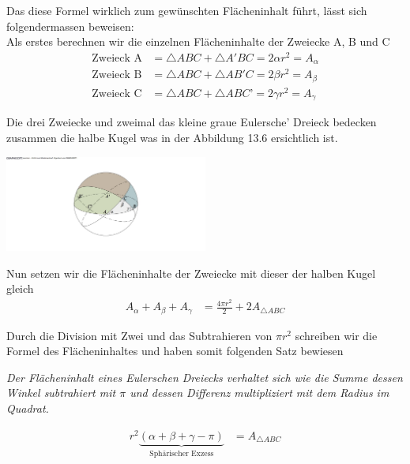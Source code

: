 \begin{refsection}
\begin{refsection}
Das diese Formel wirklich zum gewünschten Flächeninhalt führt, lässt sich folgendermassen beweisen:\\
Als erstes berechnen wir die einzelnen Flächeninhalte der Zweiecke A, B und C
\begin{align*}
\text{Zweieck A}
&=
\triangle{ABC} + \triangle{A'BC} = 2 \alpha r^{ 2 } = A_{ \alpha }\\
\text{Zweieck B}
&=
\triangle{ABC} + \triangle{AB'C} = 2 \beta r^{ 2 } = A_{ \beta }\\
\text{Zweieck C}
&=
\triangle{ABC} + \triangle{ABC’} = 2 \gamma r^{ 2 } = A_{ \gamma }
\end{align*}

Die drei Zweiecke und zweimal das kleine graue Eulersche’ Dreieck bedecken zusammen  die halbe Kugel was in der Abbildung 13.6 ersichtlich ist.

\begin{center}
        \includegraphics[width=0.5\textwidth]{kugel/1HalbeKugel.jpg}
\end{center}

Nun setzen wir die Flächeninhalte der Zweiecke mit dieser der halben Kugel gleich
\begin{align*}
A_{ \alpha } + A_{ \beta } + A_{ \gamma } &= \frac{ 4\pi r^{ 2 } }{ 2 } + 2A_{ \triangle{ ABC }}
\end{align*}

Durch die Division mit Zwei und das Subtrahieren von $\pi r^2$ schreiben wir die Formel des Flächeninhaltes und haben somit folgenden Satz bewiesen
\begin{satz} \textit{Der Flächeninhalt eines Eulerschen Dreiecks verhaltet sich wie die Summe dessen Winkel subtrahiert mit $\pi$ und dessen Differenz multipliziert mit dem Radius im Quadrat.}
\label{skript:kugel:satz:Flaecheninhalt}
\end{satz}

\begin{align*}
r^{ 2 }\underbrace{(\alpha + \beta + \gamma - \pi)}_{\text{Sphärischer Exzess}} &= A_{ \triangle{ ABC }}  
\end{align*}


\end{refsection}
\end{refsection}
